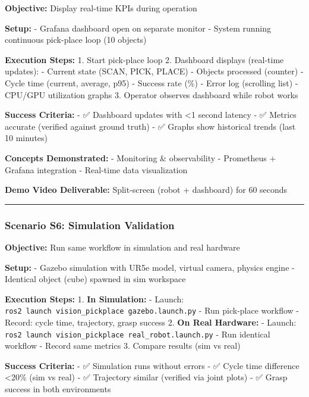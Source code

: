 \documentclass[
]{article}
\begin{document}
\textbf{Objective:} Display real-time KPIs during operation

\textbf{Setup:} - Grafana dashboard open on separate monitor - System
running continuous pick-place loop (10 objects)

\textbf{Execution Steps:} 1. Start pick-place loop 2. Dashboard displays
(real-time updates): - Current state (SCAN, PICK, PLACE) - Objects
processed (counter) - Cycle time (current, average, p95) - Success rate
(\%) - Error log (scrolling list) - CPU/GPU utilization graphs 3.
Operator observes dashboard while robot works

\textbf{Success Criteria:} - ✅ Dashboard updates with \textless1 second
latency - ✅ Metrics accurate (verified against ground truth) - ✅
Graphs show historical trends (last 10 minutes)

\textbf{Concepts Demonstrated:} - Monitoring \& observability -
Prometheus + Grafana integration - Real-time data visualization

\textbf{Demo Video Deliverable:} Split-screen (robot + dashboard) for 60
seconds

\begin{center}\rule{0.5\linewidth}{0.5pt}\end{center}

\hypertarget{scenario-s6-simulation-validation}{%
\subsubsection{Scenario S6: Simulation
Validation}\label{scenario-s6-simulation-validation}}

\textbf{Objective:} Run same workflow in simulation and real hardware

\textbf{Setup:} - Gazebo simulation with UR5e model, virtual camera,
physics engine - Identical object (cube) spawned in sim workspace

\textbf{Execution Steps:} 1. \textbf{In Simulation:} - Launch:
\texttt{ros2\ launch\ vision\_pickplace\ gazebo.launch.py} - Run
pick-place workflow - Record: cycle time, trajectory, grasp success 2.
\textbf{On Real Hardware:} - Launch:
\texttt{ros2\ launch\ vision\_pickplace\ real\_robot.launch.py} - Run
identical workflow - Record same metrics 3. Compare results (sim vs
real)

\textbf{Success Criteria:} - ✅ Simulation runs without errors - ✅
Cycle time difference \textless20\% (sim vs real) - ✅ Trajectory
similar (verified via joint plots) - ✅ Grasp success in both
environments
\end{document}
